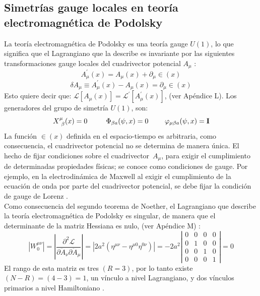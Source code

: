 \documentclass[a4paper,12pt]{article}
\begin{document}
\subsection{Simetrías gauge locales en teoría electromagnética de Podolsky}
La teoría electromagnética de Podolsky es una teoría gauge $U(1)$, lo que significa que el Lagrangiano que la describe es invariante por las siguientes transformaciones gauge locales del cuadrivector potencial $A_\mu$ \cite{elec}:
\begin{equation}
A_{\mu}^{'}(x)=A_{\mu}(x)+\partial_{\mu} \in(x) 
\end{equation}
$$\delta A_\mu\equiv A_{\mu}^{'}(x)-A_{\mu}(x)=\partial_{\mu} \in(x)$$
Esto quiere decir que: \mbox{$\mathscr{L}[A_{\mu}(x)]=\mathscr{L}^{'}[A_{\mu}^{'}(x)]$}, (ver Apéndice L). Los generadores del grupo de simetría $U(1)$, son:
\begin{equation}
 X_{\ \beta}^\mu(x)=0\ \ \ \ \ \ \ \ \Phi_{\beta a}(\psi,x)=0 \ \ \ \ \ \ \ \varphi_{\mu\beta  a}(\psi,x)={\bf I}
\end{equation}
La función $\in(x)$ definida en el espacio-tiempo es arbitraria, como consecuencia, el cuadrivector potencial no se determina de manera única. El hecho de fijar condiciones sobre el \mbox{cuadrivector $A_\mu$,} para exigir el cumplimiento de determinadas propiedades físicas; se conoce como condiciones de gauge. Por ejemplo, en la electrodinámica de Maxwell al exigir el cumplimiento de la ecuación de \mbox{onda} por parte del cuadrivector potencial, se debe fijar la condición de gauge de Lorenz \cite{elec}. 
\\

Como consecuencia del segundo teorema de Noether, el \mbox{Lagrangiano} que describe la teoría electromagnética de Podolsky es singular, de manera que el determinante de la matriz Hessiana es nulo, (ver Apéndice M) \cite{podolsky,forhaljdpo}:
\begin{equation}
|W^{\mu\nu}_0|=\left|\frac{\partial^2\mathscr{L} }{\partial\ddot A_\nu\partial\ddot A_\mu}\right|=\left|2a^2(\eta^{\mu\nu}-\eta^{\mu0}\eta^{0\nu})\right|=-2a^2\left|\begin{matrix}
0 & 0 & 0 & 0
\\ 0 & 1 & 0 & 0
\\ 0 & 0 & 1  &0
\\ 0 & 0 & 0 & 1
\end{matrix}\right|=0
\label{hesipo}
\end{equation}
El rango de esta matriz es tres \mbox{$(R=3)$}, por lo tanto \mbox{existe $(N-R)=(4-3)=1$}, un vínculo a nivel Lagrangiano, y dos vínculos primarios a nivel Hamiltoniano \cite{vinculos}. 
\\
\end{document}
